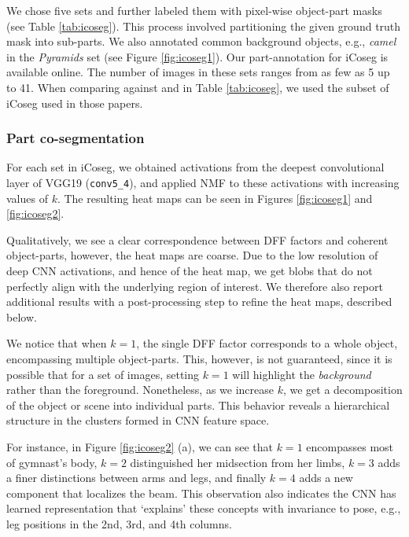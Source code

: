 \documentclass[runningheads]{llncs}
\begin{document}
	We chose five sets and further labeled them with pixel-wise object-part masks (see Table \ref{tab:icoseg}). This process involved partitioning the given ground truth mask into sub-parts.  We also annotated common background objects, e.g., \emph{camel} in the \emph{Pyramids} set (see Figure \ref{fig:icoseg1}). Our part-annotation for iCoseg is available online. The number of images in these sets ranges from as few as 5 up to 41. When comparing against \cite{vicente2011object} and \cite{rubio2012unsupervised} in Table \ref{tab:icoseg}, we used the subset of iCoseg used in those papers.

		
	
	\subsubsection{Part co-segmentation} \label{sec:icoseg_eval}
	For each set in iCoseg, we obtained activations from the deepest convolutional layer of VGG19 ({\tt conv5\_4}), and applied NMF to these activations with increasing values of $k$. The resulting heat maps can be seen in Figures \ref{fig:icoseg1} and \ref{fig:icoseg2}.
	
	Qualitatively, we see a clear correspondence between DFF factors and coherent object-parts, however, the heat maps are coarse. Due to the low resolution of deep CNN activations, and hence of the heat map, we get blobs that do not perfectly align with the underlying region of interest. We therefore also report additional results with a post-processing step to refine the heat maps, described below.
	
	We notice that when $k=1$, the single DFF factor corresponds to a whole object, encompassing multiple object-parts. This, however, is not guaranteed, since it is possible that for a set of images, setting $k=1$ will highlight the \emph{background} rather than the foreground. 
	Nonetheless, as we increase $k$, we get a decomposition of the object or scene into individual parts. This behavior reveals a hierarchical structure in the clusters formed in CNN feature space. 
	
	For instance, in Figure \ref{fig:icoseg2} (a), we can see that $k=1$ encompasses most of gymnast's body, $k=2$ distinguished her midsection from her limbs, $k=3$ adds a finer distinctions between arms and legs, and finally $k=4$ adds a new component that localizes the beam. This observation also indicates the CNN has learned representation that `explains' these concepts with invariance to pose, e.g., leg positions in the 2nd, 3rd, and 4th columns.
	
\end{document}
